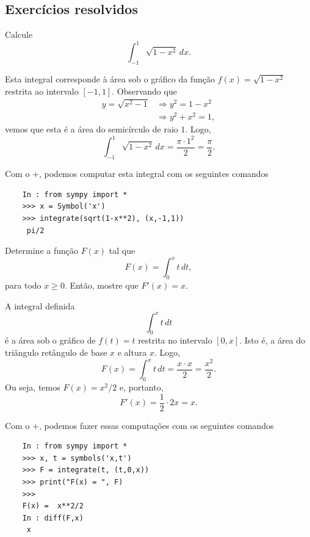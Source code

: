 \subsection*{Exercícios resolvidos}

\begin{exeresol}
  Calcule
  \begin{equation}
    \int_{-1}^1 \sqrt{1 - x^2}\,dx.
  \end{equation}
\end{exeresol}
\begin{resol}
  Esta integral corresponde à área sob o gráfico da função $f(x) = \sqrt{1 - x^2}$ restrita ao intervalo $[-1, 1]$. Observando que
  \begin{align}
    y = \sqrt{x^2 - 1} &\Rightarrow y^2 = 1 - x^2\\
                       &\Rightarrow y^2 + x^2 = 1,
  \end{align}
  vemos que esta é a área do semicírculo de raio $1$. Logo,
  \begin{equation}
    \int_{-1}^1 \sqrt{1 - x^2}\,dx = \frac{\pi \cdot 1^2}{2} = \frac{\pi}{2}.
  \end{equation}

  \ifispython
  Com o {\python}+{\sympy}, podemos computar esta integral com os seguintes comandos
  \begin{lstlisting}
    In : from sympy import *
    >>> x = Symbol('x')
    >>> integrate(sqrt(1-x**2), (x,-1,1))
     pi/2
  \end{lstlisting}
  \fi
\end{resol}

\begin{exeresol}
  Determine a função $F(x)$ tal que
  \begin{equation}
    F(x) = \int_0^x t\,dt,
  \end{equation}
  para todo $x\geq 0$. Então, mostre que $F'(x) = x$.
\end{exeresol}
\begin{resol}
  A integral definida
  \begin{equation}
    \int_0^x t\,dt
  \end{equation}
  é a área sob o gráfico de $f(t) = t$ restrita no intervalo $[0, x]$. Isto é, a área do triângulo retângulo de base $x$ e altura $x$. Logo,
  \begin{equation}
    F(x) = \int_0^x t\,dt = \frac{x\cdot x}{2} = \frac{x^2}{2}.
  \end{equation}
  Ou seja, temos $F(x) = x^2/2$ e, portanto,
  \begin{equation}
    F'(x) = \frac{1}{2}\cdot 2x = x.
  \end{equation}

  \ifispython
  Com o {\python}+{\sympy}, podemos fazer essas computações com os seguintes comandos
  \begin{lstlisting}
    In : from sympy import *
    >>> x, t = symbols('x,t')
    >>> F = integrate(t, (t,0,x))
    >>> print("F(x) = ", F)
    >>> 
    F(x) =  x**2/2
    In : diff(F,x)
     x
  \end{lstlisting}
  \fi  
\end{resol}

